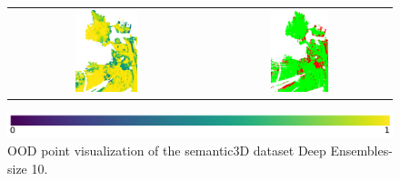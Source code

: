 \begin{figure}[h!]
\begin{tabular}{cc}
            \includegraphics[width=0.33\textwidth, height=0.18\textheight]{images/ood_imgs/fout_sem3d/fout_prob_3.pdf}& 
            \includegraphics[width=0.33\textwidth, height=0.18\textheight]{images/ood_imgs/fout_sem3d/fout_ood_auroc_3.pdf}\\
        \end{tabular}
        \includegraphics[scale=0.45]{images/prob_legend.pdf}
        \caption{OOD point visualization of the semantic3D dataset Deep Ensembles-size 10.}
        \label{fig:fout_ood_auroc_sem3d_prob}
    \end{figure}
